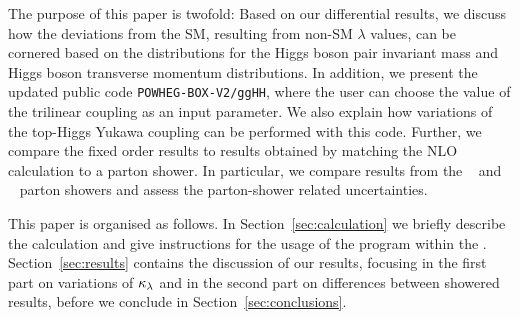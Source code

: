 The purpose of this paper is twofold: Based on our differential results, we discuss how the deviations from the SM, resulting from non-SM $\lambda$ values, can be cornered based on the distributions for the Higgs boson pair invariant mass and Higgs boson transverse momentum distributions. 
In addition, we present the updated public code {\tt POWHEG-BOX-V2/ggHH}, where the user can choose the value of the trilinear coupling as an input parameter.
We also explain how variations of the top-Higgs Yukawa coupling can be performed with this code.
Further, we compare the fixed order results to results obtained by matching the NLO calculation to a parton shower. In particular, we compare results from the \pythia~\cite{Sjostrand:2014zea} and \herwig~\cite{Bellm:2017bvx} parton showers and assess the parton-shower related uncertainties.

This paper is organised as follows. In Section~\ref{sec:calculation} we briefly describe the calculation and give instructions for the usage of the program within the \powhegbox. Section~\ref{sec:results} contains the discussion of our results, focusing in the first part on variations of $\kappa_{\lambda}$ and in the second part on differences between showered results, 
before we conclude in Section~\ref{sec:conclusions}.
